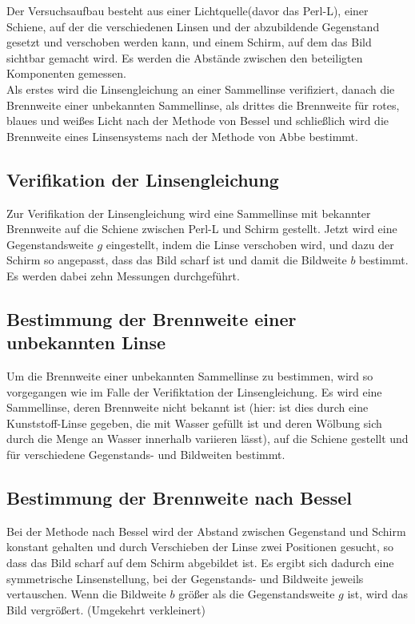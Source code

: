 Der Versuchsaufbau besteht aus einer Lichtquelle(davor das Perl-L), einer Schiene, auf der
die verschiedenen Linsen und der abzubildende Gegenstand gesetzt und
verschoben werden kann, und einem Schirm, auf dem das Bild sichtbar
gemacht wird. Es werden die Abstände zwischen den beteiligten Komponenten gemessen.\\

Als erstes wird die Linsengleichung an einer Sammellinse
verifiziert, danach die Brennweite einer unbekannten Sammellinse, als drittes die Brennweite für rotes, blaues und weißes Licht
nach der Methode von Bessel und schließlich wird die Brennweite eines Linsensystems nach der Methode von Abbe bestimmt.

\subsection{Verifikation der Linsengleichung}

Zur Verifikation der Linsengleichung wird eine Sammellinse mit bekannter Brennweite auf die Schiene zwischen Perl-L und Schirm gestellt. Jetzt wird
eine Gegenstandsweite $g$ eingestellt, indem die Linse verschoben wird,
und dazu der Schirm so angepasst, dass das Bild scharf ist und damit die Bildweite $b$ bestimmt. Es werden dabei zehn Messungen durchgeführt.

\subsection{Bestimmung der Brennweite einer unbekannten Linse}

Um die Brennweite einer unbekannten Sammellinse zu bestimmen, wird so
vorgegangen wie im Falle der Verifiktation der Linsengleichung. Es wird
eine Sammellinse, deren Brennweite nicht bekannt ist (hier: ist dies durch eine Kunststoff-Linse gegeben, die mit Wasser gefüllt ist
und deren Wölbung sich durch die Menge an Wasser innerhalb variieren
lässt), auf die Schiene gestellt und für verschiedene Gegenstands- und Bildweiten bestimmt.

\subsection{Bestimmung der Brennweite nach Bessel}

Bei der Methode nach Bessel wird der Abstand zwischen Gegenstand und Schirm
konstant gehalten und durch Verschieben der Linse zwei Positionen
gesucht, so dass das Bild scharf auf dem Schirm abgebildet ist. Es ergibt
sich dadurch eine symmetrische Linsenstellung, bei der Gegenstands- und
Bildweite jeweils vertauschen. Wenn die Bildweite $b$ größer als
die Gegenstandsweite $g$ ist, wird das Bild vergrößert. (Umgekehrt verkleinert)\\

